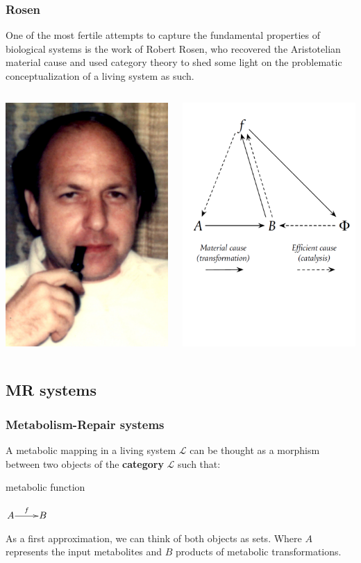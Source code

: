 \begin{frame}

\frametitle{Rosen}

One of the most fertile attempts to capture the fundamental properties of biological systems is the work of Robert Rosen, who recovered the Aristotelian material cause and used category theory to shed some light on the problematic conceptualization of a living system as such. \cite{Rashevsky1954,Rosen1958a,Rosen1958,Rashevsky1965,Rosen1978,Rosen1985,Rosen1991}
 \begin{columns}
    \begin{column}{0.5\textwidth}
      \centering
		\includegraphics[width=3 cm]{fig/rosen.jpg}
    \end{column}
    \begin{column}{0.5\textwidth}
      \centering
	      \includegraphics[width=4 cm]{fig/rosen_diagram.pdf}
    \end{column}
\end{columns}

\end{frame}

\begin{frame}

\subsection{MR systems}
\frametitle{Metabolism-Repair systems}
A metabolic mapping in a living system $\mathcal{L}$ can be thought as a morphism between two objects of the \textbf{category} $\mathcal{L}$ such that:
\begin{block}{metabolic function}
\begin{center}
	$\xymatrix@1{
	A\ar[r]^-{f} & B
	}$
\end{center}
\end{block}
As a first approximation, we can think of both objects as sets. Where $A$ represents the input metabolites and $B$  products of metabolic transformations.
\end{frame}

